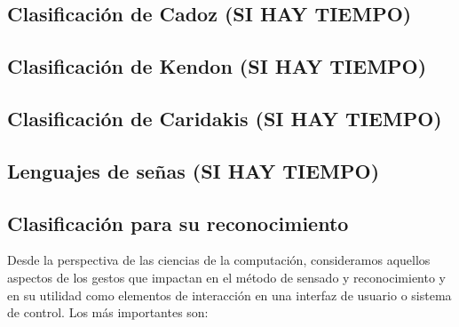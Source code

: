 %

\subsection{Clasificación de Cadoz  (SI HAY TIEMPO)}



\subsection{Clasificación de Kendon (SI HAY TIEMPO)}



\subsection{Clasificación de Caridakis (SI HAY TIEMPO) }

\subsection{Lenguajes de señas (SI HAY TIEMPO)}

\subsection{Clasificación para su reconocimiento} 

Desde la perspectiva de las ciencias de la computación, consideramos aquellos aspectos de los gestos que impactan en el método de sensado y reconocimiento y en su utilidad como elementos de interacción en una interfaz de usuario o sistema de control. Los más importantes son:

